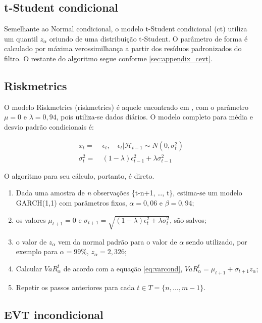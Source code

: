 \documentclass[1p]{elsarticle}
\theoremstyle{definition}
\begin{document}
\subsection{t-Student condicional}

Semelhante ao Normal condicional, o modelo t-Student condicional (ct) utiliza um quantil $z_\alpha$ oriundo de uma distribuição t-Student. O parâmetro de forma é calculado por máxima verossimilhança a partir dos resíduos padronizados do filtro. O restante do algoritmo segue conforme \ref{sec:appendix_cevt}.

\subsection{Riskmetrics}
\label{sec:appendix_riskmetrics}

O modelo Riskmetrics (riskmetrics) é aquele encontrado em \cite{RiskMetrics1995}, com o parâmetro $\mu = 0$ e $\lambda = 0,94$, pois utiliza-se dados diários. O modelo completo para média e desvio padrão condicionais é:

\begin{align}
	x_t=&\ \epsilon_t, \quad \epsilon_t|\mathcal{H}_{t-1} \sim N(0, \sigma^2_t)\\
	\sigma^2_t=&\ (1-\lambda)\epsilon^2_{t-1}+\lambda \sigma^2_{t-1}
\end{align}

O algoritmo para seu cálculo, portanto, é direto. 

\begin{enumerate}
	\item Dada uma amostra de \emph{n} observações \{t-n+1, \ldots, t\}, estima-se um modelo GARCH(1,1) com parâmetros fixos, $\alpha=0,06$ e $\beta = 0,94$;
	\item os valores $\mu_{t+1} = 0$ e $\sigma_{t+1}=\sqrt{(1-\lambda)\epsilon^2_{t}+\lambda \sigma^2_{t}}$, são salvos;
	\item o valor de $z_\alpha$ vem da normal padrão para o valor de $\alpha$ sendo utilizado, por exemplo para $\alpha = 99\%$, $z_\alpha = 2,326$;
	\item Calcular $VaR^t_\alpha$ de acordo com a equação \eqref{eq:varcond}, $VaR_\alpha^t=\mu_{t+1}+\sigma_{t+1}z_\alpha$;
	\item Repetir os passos anteriores para cada $t \in T = \{n, \ldots, m-1\}$.
\end{enumerate}

\subsection{EVT incondicional}
\label{sec:appendix_uevt}
\end{document}
